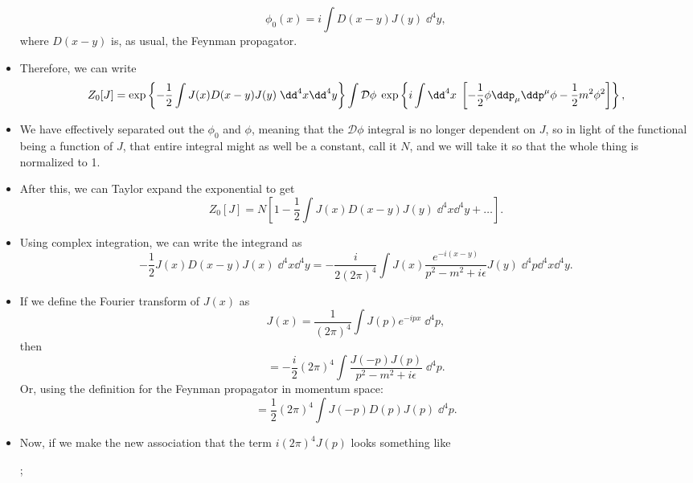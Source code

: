 \begin{itemize}
        \begin{equation}
            \phi_0(x) = i\int D(x-y)J(y) \;\dd^4y,
        \end{equation}
        where $D(x-y)$ is, as usual, the Feynman propagator.
    \item Therefore, we can write
        \begin{equation}
            Z_0[J] = \exp\left\{ -\frac{1}{2}\int J(x)D(x-y)J(y)\;\dd^4x\dd^4y \right\} \int\mathcal{D}\phi \;\exp\left\{ i\int\dd^4x \; \left[ -\frac{1}{2}\phi\ddp_{\mu}\ddp^{\mu}\phi - \frac{1}{2}m^2\phi^2\right] \right\},
        \end{equation}
    \item We have effectively separated out the $\phi_0$ and $\phi$, meaning that the $\mathcal{D}\phi$ integral is no longer dependent on $J$, so in light of the functional being a function of $J$, that entire integral might as well be a constant, call it $N$, and we will take it so that the whole thing is normalized to 1.
    \item After this, we can Taylor expand the exponential to get
        \begin{equation}
            Z_0[J] = N\left[ 1 - \frac{1}{2}\int J(x)D(x-y)J(y) \;\dd^4x\dd^4y + \ldots \right].
        \end{equation}
    \item Using complex integration, we can write the integrand as
        \begin{equation}
            -\frac{1}{2}J(x)D(x-y)J(x)\;\dd^4x\dd^4y = -\frac{i}{2(2\pi)^4} \int J(x) \frac{e^{-i(x-y)}}{p^2 - m^2 + i\epsilon} J(y) \;\dd^4p\dd^4x\dd^4y.
        \end{equation}
    \item If we define the Fourier transform of $J(x)$ as 
        \begin{equation}
            J(x) = \frac{1}{(2\pi)^4}\int J(p) e^{-ipx} \;\dd^4p,
        \end{equation}
        then 
        \begin{equation}
            = -\frac{i}{2}(2\pi)^4 \int \frac{J(-p)J(p)}{p^2 - m^2 + i\epsilon} \;\dd^4p.
        \end{equation}
        Or, using the definition for the Feynman propagator in momentum space:
        \begin{equation}
            = \frac{1}{2}(2\pi)^4 \int J(-p)D(p)J(p) \;\dd^4p.
        \end{equation}
    \item Now, if we make the new association that the term $i(2\pi)^4 J(p)$ looks something like
        \begin{center}
        ;
        \end{center}
        

\end{itemize}
